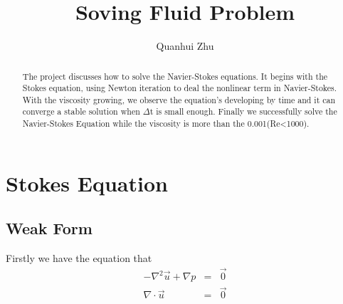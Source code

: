 \documentclass[a4paper]{article}
\title{Soving Fluid Problem}
\author{Quanhui Zhu}
\begin{document}
\maketitle

\begin{abstract}
The project discusses how to solve the Navier-Stokes equations. It begins with the Stokes equation, using Newton iteration to deal the nonlinear term in Navier-Stokes. With the viscosity growing, we observe the equation's developing by time and it can converge a stable solution when $\Delta$t is small enough. Finally we successfully solve the Navier-Stokes Equation while the viscosity is more than the 0.001(Re<1000).
\end{abstract}


\section{Stokes Equation}

\subsection{Weak Form}

Firstly we have the equation that
\begin{equation}
\begin{array}{rcl}
-\nabla^2 \vec{u} + \nabla p &=& \vec{0} \\
\nabla \cdot \vec{u} &=& \vec{0}
\label{eq::Stokes-problem}
\end{array}
\end{equation}
\end{document}
